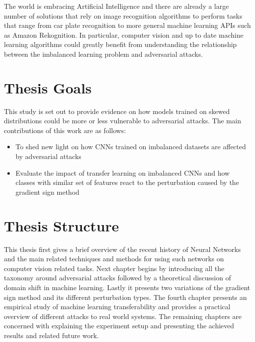 The world is embracing Artificial Intelligence and there are already a large number of solutions that rely on image recognition algorithms to perform tasks that range from car plate recognition to more general machine learning APIs such as Amazon Rekognition. In particular, computer vision and up to date machine learning algorithms could greatly benefit from understanding the relationship between the imbalanced learning problem and adversarial attacks.

\section{Thesis Goals}
This study is set out to provide evidence on how models trained on skewed distributions could be more or less vulnerable to adversarial attacks. The main contributions of this work are as follows:
\begin{itemize}
	\item To shed new light on how CNNs trained on imbalanced datasets are affected by adversarial attacks
	\item Evaluate the impact of transfer learning on imbalanced CNNs and how classes with similar set of features react to the perturbation caused by the gradient sign method
\end{itemize}

\section{Thesis Structure}

This thesis first gives a brief overview of the recent history of Neural Networks and the main related techniques and methods for using such networks on computer vision related tasks. Next chapter begins by introducing all the taxonomy around adversarial attacks followed by a theoretical discussion of domain shift in machine learning. Lastly it presents two variations of the gradient sign method and its different perturbation types. The fourth chapter presents an empirical study of machine learning transferability and provides a practical overview of different attacks to real world systems. The remaining chapters are concerned with explaining the experiment setup and presenting the achieved results and related future work.
